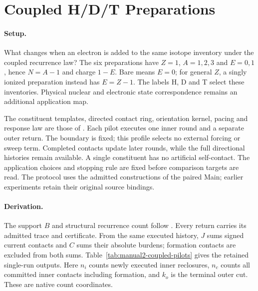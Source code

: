 \section{Coupled H/D/T Preparations}
\label{manual2:coupled-preparation-pilots}
\paragraph{Setup.}
What changes when an electron is added to the same isotope inventory under the
coupled recurrence law? The six preparations have $Z=1$, $A=1,2,3$ and
$E=0,1$, hence $N=A-1$ and charge $1-E$. Bare means $E=0$; for general $Z$,
a singly ionized preparation instead has $E=Z-1$. The labels H, D and T select
these inventories. Physical nuclear and electronic state correspondence
remains an additional application map.

The constituent templates, directed contact ring, orientation kernel, pacing
and response law are those of . Each
pilot executes one inner round and a separate outer return. The boundary is
fixed; this profile selects no external forcing or sweep term. Completed
contacts update later rounds, while the full directional histories remain
available. A single constituent has no artificial self-contact. The
application choices and stopping rule are fixed before comparison targets are
read. The protocol uses the admitted constructions of the paired Main;
earlier experiments retain their original source bindings.

\paragraph{Derivation.}
The support $B$ and structural recurrence count follow
. Every return carries its admitted trace
and certificate. From the same executed history, $J$ sums signed current
contacts and $C$ sums their absolute burdens; formation contacts are excluded
from both sums. Table~\ref{tab:manual2-coupled-pilots} gives the retained
single-run outputs. Here $n_i$ counts newly executed inner reclosures, $n_c$
counts all committed inner contacts including formation, and $k_o$ is the
terminal outer cut. These are native count coordinates.

